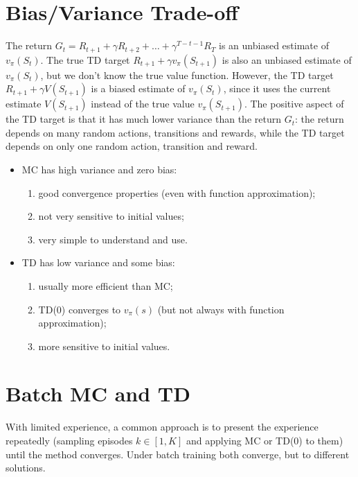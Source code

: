 \section{Bias/Variance Trade-off}
The return $G_t=R_{t+1}+\gamma R_{t+2}+\dots+\gamma^{T-t-1}R_T$ is an unbiased estimate of $v_\pi(S_t)$. The true TD target $R_{t+1}+\gamma v_\pi(S_{t+1})$ is also an unbiased estimate of $v_\pi(S_t)$, but we don't know the true value function. However, the TD target $R_{t+1}+\gamma V(S_{t+1})$ is a biased estimate of $v_\pi(S_t)$, since it uses the current estimate $V(S_{t+1})$ instead of the true value $v_\pi(S_{t+1})$. The positive aspect of the TD target is that it has much lower variance than the return $G_t$: the return depends on many random actions, transitions and rewards, while the TD target depends on only one random action, transition and reward.
\begin{itemize}
    \item MC has high variance and zero bias:
    \begin{enumerate}
        \item good convergence properties (even with function approximation);
        \item not very sensitive to initial values;
        \item very simple to understand and use.
    \end{enumerate}
    \item TD has low variance and some bias:
    \begin{enumerate}
        \item usually more efficient than MC;
        \item TD(0) converges to $v_\pi(s)$ (but not always with function approximation);
        \item more sensitive to initial values.
    \end{enumerate}
\end{itemize}

\section{Batch MC and TD}
With limited experience, a common approach is to present the experience repeatedly (sampling episodes $k\in[1,K]$ and applying MC or TD(0) to them) until the method converges. Under batch training both converge, but to different solutions.

